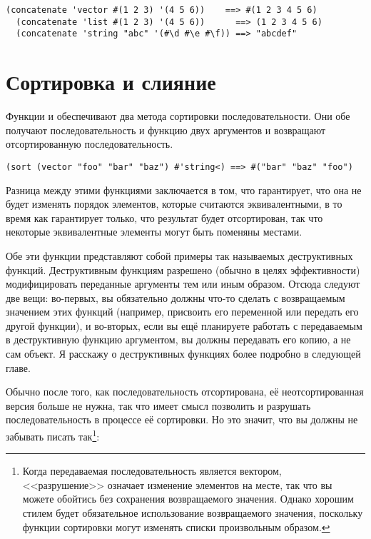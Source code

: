 \begin{lstlisting}[style=lisprepl]
  (concatenate 'vector #(1 2 3) '(4 5 6))    ==> #(1 2 3 4 5 6)
  (concatenate 'list #(1 2 3) '(4 5 6))      ==> (1 2 3 4 5 6)
  (concatenate 'string "abc" '(#\d #\e #\f)) ==> "abcdef"
\end{lstlisting}

\section{Сортировка и слияние}

Функции  и  обеспечивают два метода сортировки
последовательности.  Они обе получают последовательность и функцию двух аргументов и
возвращают отсортированную последовательность.

\begin{lstlisting}[style=lisprepl]
  (sort (vector "foo" "bar" "baz") #'string<) ==> #("bar" "baz" "foo")
\end{lstlisting}

Разница между этими функциями заключается в том, что  гарантирует, что
она не будет изменять порядок элементов, которые считаются эквивалентными, в то время как
 гарантирует только, что результат будет отсортирован, так что некоторые
эквивалентные элементы могут быть поменяны местами.

Обе эти функции представляют собой примеры так называемых деструктивных функций.  Деструктивным
функциям разрешено (обычно в целях эффективности) модифицировать переданные аргументы тем
или иным образом.  Отсюда следуют две вещи: во-первых, вы обязательно должны что-то сделать с
возвращаемым значением этих функций (например, присвоить его переменной или передать его
другой функции), и во-вторых, если вы ещё планируете работать с передаваемым в
деструктивную функцию аргументом, вы должны передавать его копию, а не сам объект.
Я расскажу о деструктивных функциях более подробно в следующей главе.

Обычно после того, как последовательность отсортирована, её неотсортированная версия
больше не нужна, так что имеет смысл
позволить  и  разрушать последовательность в процессе её
сортировки.  Но это значит, что вы должны не забывать писать так\footnote{Когда
  передаваемая последовательность является вектором, <<разрушение>> означает изменение
  элементов на месте, так что вы можете обойтись без сохранения возвращаемого значения.
  Однако хорошим стилем будет обязательное использование возвращаемого значения,
  поскольку функции сортировки могут изменять списки произвольным образом.}:

